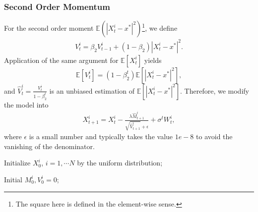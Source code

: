 \documentclass{beamer}
\begin{document}
\begin{frame}
	\frametitle{Second Order Momentum}
	For the second order moment $\mathbb{E}(|X^i_t-x^*|^2)$\footnote{The square here is defined in the element-wise sense.}, we define 
\begin{equation}
	\begin{aligned}
	\label{equ:CBO second order moment}	V^i_t  = \beta_2 V^i_{t-1} + (1-\beta_2) |X^i_t - x^*|^2. 
	\end{aligned}
\end{equation}
Application of the same argument for $\mathbb{E}[X^i_t]$ yields
\begin{equation}
	\mathbb{E}[V^i_t] = (1-\beta_2^t) \mathbb{E}[|X^i_t-x^*|^2],
\end{equation}
and $\hat{V}^i_t = \frac{V^i_t}{1-\beta_2^t}$ is an unbiased estimation of $\mathbb{E}[|X^i_t- x^*|^2]$. Therefore, we modify the model into 
\begin{equation}
	\begin{aligned}
	\label{equ: CBO moment model true}	X^i_{t+1} = X_t^i - \frac{\lambda \hat{M}^i_{t+1}}{\sqrt{\hat{V}^i_{t+1}} + \epsilon} + \sigma^ t  W_t^i,
	\end{aligned}
\end{equation}
where $\epsilon$ is a small number and typically takes the value $1e-8$ to avoid the vanishing of the denominator.
\end{frame}
\begin{frame}
\small{
\begin{algorithm}[H]

  Initialize $X^i_0$, $i = 1,\cdots N$ by the uniform distribution;
  
  Initial $M^i_0,V^i_0 =0$;
  
  \label{alg:CBO-moment}
\end{algorithm}
}
\end{frame}
\end{document}

